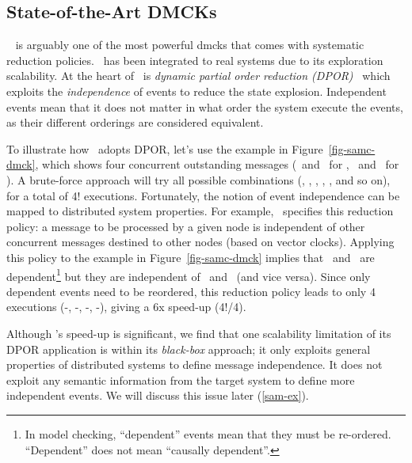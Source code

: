 


\subsection{State-of-the-Art DMCKs}
\label{mot-state}



\modist~\cite{Yang+09-Modist} is arguably one of the most powerful dmcks that
comes with systematic reduction policies.  \modist\ has been integrated to real
systems due to its exploration scalability.  At the heart of \modist\ is {\em
dynamic partial order reduction (DPOR)}~\cite{Flanagan+05-Dpor} which exploits
the {\em independence} of events to reduce the state explosion.  Independent
events mean that it does not matter in what order the system execute the
events, as their different orderings are considered equivalent.

To illustrate how \modist\ adopts DPOR, let's use the example in
Figure~\ref{fig-samc-dmck}, which shows four concurrent outstanding messages
 (\ma\ and \mb\ for \none, \mc\ and \md\ for \ntwo).  A brute-force
approach will try all possible combinations (, , ,
, , and so on), for a total of 4!  executions.
Fortunately, the notion of event independence can be mapped to distributed
system properties.  For example, \modist\ specifies this reduction policy: a
message to be processed by a given node is independent of other concurrent
messages destined to other nodes (based on vector clocks).  Applying this
policy to the example in Figure~\ref{fig-samc-dmck} implies that \ma\ and \mb\ are
dependent\footnote[1]{In model checking, ``dependent'' events mean that they
must be re-ordered.  ``Dependent'' does not mean ``causally dependent''.}  but
they are independent of \mc\ and \md\ (and vice versa).  Since only dependent
events need to be reordered, this reduction policy leads to only 4 executions
(\ma\mb-\mc\md, \ma\mb-\md\mc, \mb\ma-\mc\md, \mb\ma-\md\mc), giving a 6x
speed-up (4!/4).


Although \modist's speed-up is significant, we find that one
scalability limitation of its DPOR application is within its {\em
  black-box} approach; it only exploits general properties of
distributed systems to define message independence.  It does not
exploit any semantic information from the target system to define more
independent events.  We will discuss this issue later
(\sec\ref{sam-ex}).



